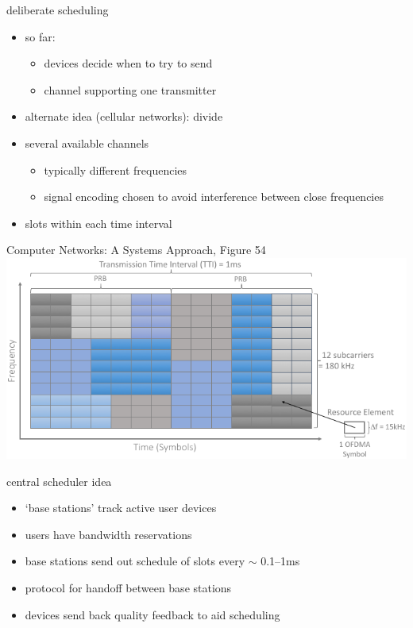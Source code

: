 \begin{frame}{deliberate scheduling}
\begin{itemize}
\item so far: 
    \begin{itemize}
    \item devices decide when to try to send
    \item channel supporting one transmitter
    \end{itemize}
\vspace{.5cm}
\item alternate idea (cellular networks): divide
\item several available channels
    \begin{itemize}
    \item typically different frequencies
    \item signal encoding chosen to avoid interference between close frequencies
    \end{itemize}
\item slots within each time interval
\end{itemize}
\end{frame}

\begin{frame}

{\fontsize{9}{10}\selectfont Computer Networks: A Systems Approach, Figure 54}
\includegraphics[width=\textwidth]{CNSA-Fig54}
\end{frame}

\begin{frame}{central scheduler idea}
    \begin{itemize}
    \item `base stations' track active user devices
    \item users have bandwidth reservations
    \vspace{.5cm}
    \item base stations send out schedule of slots every $\sim$ 0.1--1ms
    \item protocol for handoff between base stations
    \item devices send back quality feedback to aid scheduling
    \end{itemize}
\end{frame}

